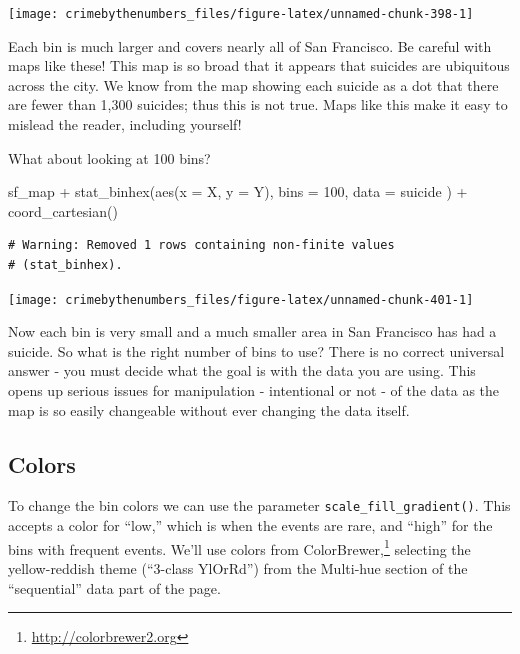 \documentclass[
  a4paper,
]{krantz}
\makeatletter
\newenvironment{Shaded}{\begin{snugshade}}{\end{snugshade}}
\newcommand{\AttributeTok}[1]{\textcolor[rgb]{0.77,0.63,0.00}{#1}}
\newcommand{\DecValTok}[1]{\textcolor[rgb]{0.00,0.00,0.81}{#1}}
\newcommand{\FunctionTok}[1]{\textcolor[rgb]{0.00,0.00,0.00}{#1}}
\newcommand{\NormalTok}[1]{#1}
\newcommand{\SpecialCharTok}[1]{\textcolor[rgb]{0.00,0.00,0.00}{#1}}
\renewcommand{\href}[2]{#2\footnote{\url{#1}}}
\newenvironment{kframe}{%
\medskip{}
\setlength{\fboxsep}{.8em}
 \def\at@end@of@kframe{}%
 \ifinner\ifhmode%
  \def\at@end@of@kframe{\end{minipage}}%
  \begin{minipage}{\columnwidth}%
 \fi\fi%
 \def\FrameCommand##1{\hskip\@totalleftmargin \hskip-\fboxsep
 \colorbox{shadecolor}{##1}\hskip-\fboxsep
     \hskip-\linewidth \hskip-\@totalleftmargin \hskip\columnwidth}%
 \MakeFramed {\advance\hsize-\width
   \@totalleftmargin\z@ \linewidth\hsize
   \@setminipage}}%
 {\par\unskip\endMakeFramed%
 \at@end@of@kframe}
\renewenvironment{Shaded}{\begin{kframe}}{\end{kframe}}
\makeatother
\begin{document}
\begin{center}\texttt{[image: crimebythenumbers\_files/figure-latex/unnamed-chunk-398-1]} \end{center}

Each bin is much larger and covers nearly all of San
Francisco. Be careful with maps like these! This map is so
broad that it appears that suicides are ubiquitous across
the city. We know from the map showing each suicide as a dot
that there are fewer than 1,300 suicides; thus this is not
true. Maps like this make it easy to mislead the reader,
including yourself!

What about looking at 100 bins?

\begin{Shaded}
\begin{Highlighting}[]
\NormalTok{sf\_map }\SpecialCharTok{+}
  \FunctionTok{stat\_binhex}\NormalTok{(}\FunctionTok{aes}\NormalTok{(}\AttributeTok{x =}\NormalTok{ X, }\AttributeTok{y =}\NormalTok{ Y),}
    \AttributeTok{bins =} \DecValTok{100}\NormalTok{,}
    \AttributeTok{data =}\NormalTok{ suicide}
\NormalTok{  ) }\SpecialCharTok{+}
  \FunctionTok{coord\_cartesian}\NormalTok{()}
\end{Highlighting}
\end{Shaded}

\begin{verbatim}
# Warning: Removed 1 rows containing non-finite values
# (stat_binhex).
\end{verbatim}

\begin{center}\texttt{[image: crimebythenumbers\_files/figure-latex/unnamed-chunk-401-1]} \end{center}

Now each bin is very small and a much smaller area in San
Francisco has had a suicide. So what is the right number of
bins to use? There is no correct universal answer - you must
decide what the goal is with the data you are using. This
opens up serious issues for manipulation - intentional or
not - of the data as the map is so easily changeable without
ever changing the data itself.

\hypertarget{colors}{%
\subsection{Colors}\label{colors}}

To change the bin colors we can use the parameter
\texttt{scale\_fill\_gradient()}. This accepts a color for
``low,'' which is when the events are rare, and ``high'' for
the bins with frequent events. We'll use colors from
\href{http://colorbrewer2.org}{ColorBrewer,} selecting the
yellow-reddish theme (``3-class YlOrRd'') from the Multi-hue
section of the ``sequential'' data part of the page.
\end{document}
